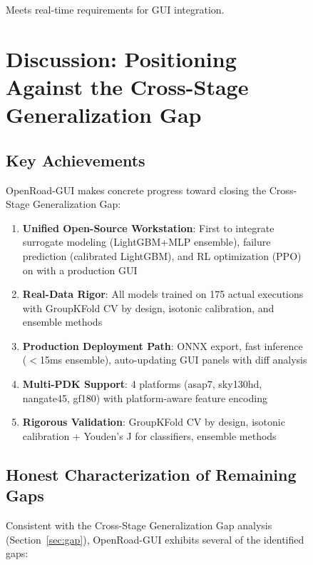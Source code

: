 \documentclass[10pt,conference]{IEEEtran}
\newcommand{\ORFS}{\text{ORFS}}
\begin{document}
\begin{figure}[t]
Meets real-time requirements for GUI integration.


\section{Discussion: Positioning Against the Cross-Stage Generalization Gap}
\label{sec:discussion}

\subsection{Key Achievements}

OpenRoad-GUI makes concrete progress toward closing the Cross-Stage Generalization Gap:

\begin{enumerate}
    \item \textbf{Unified Open-Source Workstation}: First to integrate surrogate modeling (LightGBM+MLP ensemble), failure prediction (calibrated LightGBM), and RL optimization (PPO) on \ORFS{} with a production GUI
    \item \textbf{Real-Data Rigor}: All models trained on 175 actual \ORFS{} executions with GroupKFold CV by design, isotonic calibration, and ensemble methods
    \item \textbf{Production Deployment Path}: ONNX export, fast inference ($<$15ms ensemble), auto-updating GUI panels with diff analysis
    \item \textbf{Multi-PDK Support}: 4 platforms (asap7, sky130hd, nangate45, gf180) with platform-aware feature encoding
    \item \textbf{Rigorous Validation}: GroupKFold CV by design, isotonic calibration + Youden's J for classifiers, ensemble methods
\end{enumerate}

\subsection{Honest Characterization of Remaining Gaps}

Consistent with the Cross-Stage Generalization Gap analysis (Section~\ref{sec:gap}), OpenRoad-GUI exhibits several of the identified gaps:


\end{figure}
\end{document}

